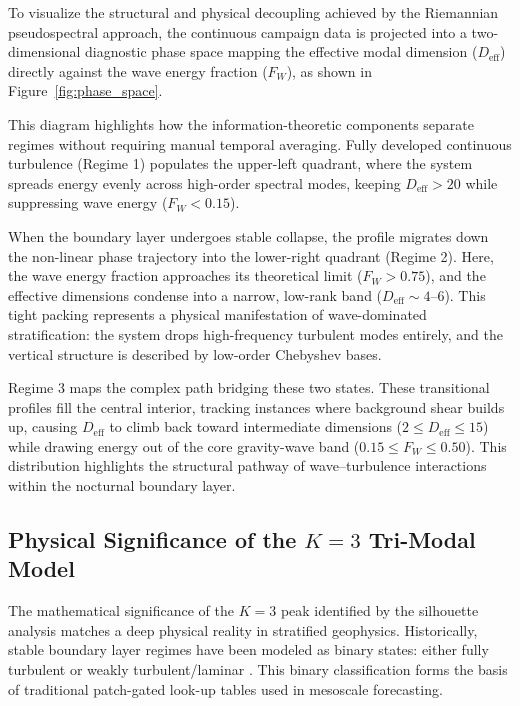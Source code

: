 To visualize the structural and physical decoupling achieved by the Riemannian pseudospectral approach, the continuous campaign data is projected into a two-dimensional diagnostic phase space mapping the effective modal dimension ($D_{\mathrm{eff}}$) directly against the wave energy fraction ($F_W$), as shown in Figure~\ref{fig:phase_space}.

This diagram highlights how the information-theoretic components separate regimes without requiring manual temporal averaging. Fully developed continuous turbulence (Regime 1) populates the upper-left quadrant, where the system spreads energy evenly across high-order spectral modes, keeping $D_{\mathrm{eff}} > 20$ while suppressing wave energy ($F_W < 0.15$).

When the boundary layer undergoes stable collapse, the profile migrates down the non-linear phase trajectory into the lower-right quadrant (Regime 2). Here, the wave energy fraction approaches its theoretical limit ($F_W > 0.75$), and the effective dimensions condense into a narrow, low-rank band ($D_{\mathrm{eff}} \sim 4$--$6$). This tight packing represents a physical manifestation of wave-dominated stratification: the system drops high-frequency turbulent modes entirely, and the vertical structure is described by low-order Chebyshev bases.

Regime 3 maps the complex path bridging these two states. These transitional profiles fill the central interior, tracking instances where background shear builds up, causing $D_{\mathrm{eff}}$ to climb back toward intermediate dimensions ($2 \le D_{\mathrm{eff}} \le 15$) while drawing energy out of the core gravity-wave band ($0.15 \le F_W \le 0.50$). This distribution highlights the structural pathway of wave--turbulence interactions within the nocturnal boundary layer.

\subsection{Physical Significance of the $K=3$ Tri-Modal Model}
\label{sec:results:significance}

The mathematical significance of the $K=3$ peak identified by the silhouette analysis matches a deep physical reality in stratified geophysics. Historically, stable boundary layer regimes have been modeled as binary states: either fully turbulent or weakly turbulent/laminar \citep{Mahrt2014, Acevedo2016}. This binary classification forms the basis of traditional patch-gated look-up tables used in mesoscale forecasting.


